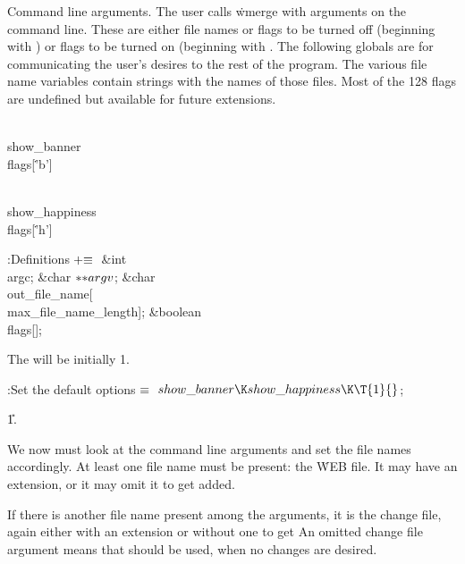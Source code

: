 Command line arguments.
The user calls \.{wmerge} with arguments on the command line.
These are either file names or flags to be turned off (beginning with )
or flags to be turned on (beginning with .
The following globals are for communicating the user's desires to the rest
of the program. The various file name variables contain strings with
the names of those files. Most of the 128 flags are undefined but available
for future extensions.

\Y\B\4\D\\{show\_banner}\5
\\{flags}[\.{'b'}]\par
\B\4\D\\{show\_happiness}\5
\\{flags}[\.{'h'}]\par
\Y\B\4:Definitions\X${}\mathrel+\equiv{}$\6
\&{int} \\{argc};\6
\&{char} ${}{*}{*}\\{argv}{}$;\6
\&{char} \\{out\_file\_name}[\\{max\_file\_name\_length}];\6
\&{boolean} \\{flags}[];\par
\fi

The  will be initially 1.

\Y\B\4:Set the default options\X${}\equiv{}$\6
$\\{show\_banner}\K\\{show\_happiness}\K\T{1}{}$;\par
\U1.\fi

We now must look at the command line arguments and set the file names
accordingly.  At least one file name must be present: the \.{WEB}
file.  It may have an extension, or it may omit it to get 
added.

If there is another file name present among the arguments, it is the
change file, again either with an extension or without one to get 
An omitted change file argument means that  should be used,
when no changes are desired.

